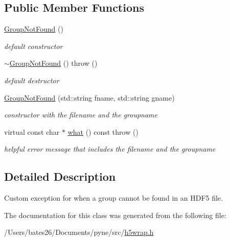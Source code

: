 \subsection*{Public Member Functions}
\begin{DoxyCompactItemize}
\item 
\hypertarget{classh5wrap_1_1_group_not_found_accc7d7bea9e86968335a46ee39d7d543}{\hyperlink{classh5wrap_1_1_group_not_found_accc7d7bea9e86968335a46ee39d7d543}{Group\+Not\+Found} ()}\label{classh5wrap_1_1_group_not_found_accc7d7bea9e86968335a46ee39d7d543}

\begin{DoxyCompactList}\small\item\em default constructor \end{DoxyCompactList}\item 
\hypertarget{classh5wrap_1_1_group_not_found_a79dea7d1d5e3ffd7a7e83b4a2636398a}{\hyperlink{classh5wrap_1_1_group_not_found_a79dea7d1d5e3ffd7a7e83b4a2636398a}{$\sim$\+Group\+Not\+Found} ()  throw ()}\label{classh5wrap_1_1_group_not_found_a79dea7d1d5e3ffd7a7e83b4a2636398a}

\begin{DoxyCompactList}\small\item\em default destructor \end{DoxyCompactList}\item 
\hypertarget{classh5wrap_1_1_group_not_found_a74f7e8f6efcf33503f5fec62eead40c3}{\hyperlink{classh5wrap_1_1_group_not_found_a74f7e8f6efcf33503f5fec62eead40c3}{Group\+Not\+Found} (std\+::string fname, std\+::string gname)}\label{classh5wrap_1_1_group_not_found_a74f7e8f6efcf33503f5fec62eead40c3}

\begin{DoxyCompactList}\small\item\em constructor with the filename and the groupname \end{DoxyCompactList}\item 
\hypertarget{classh5wrap_1_1_group_not_found_a76766dc5fda0a07564379db454df87d0}{virtual const char $\ast$ \hyperlink{classh5wrap_1_1_group_not_found_a76766dc5fda0a07564379db454df87d0}{what} () const   throw ()}\label{classh5wrap_1_1_group_not_found_a76766dc5fda0a07564379db454df87d0}

\begin{DoxyCompactList}\small\item\em helpful error message that includes the filename and the groupname \end{DoxyCompactList}\end{DoxyCompactItemize}


\subsection{Detailed Description}
Custom exception for when a group cannot be found in an H\+D\+F5 file. 

The documentation for this class was generated from the following file\+:\begin{DoxyCompactItemize}
\item 
/\+Users/bates26/\+Documents/pyne/src/\hyperlink{h5wrap_8h}{h5wrap.\+h}\end{DoxyCompactItemize}
